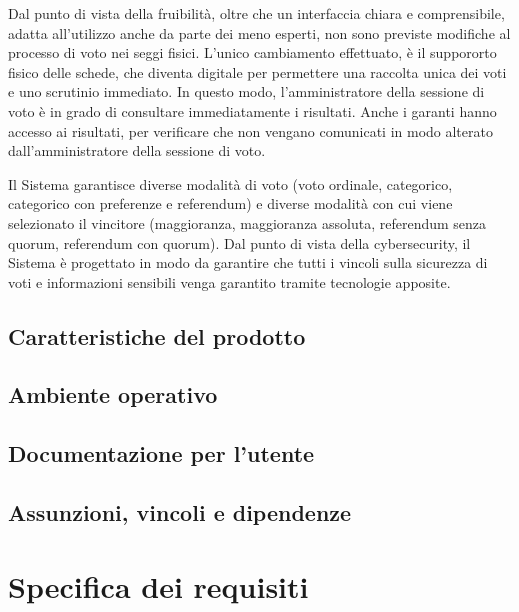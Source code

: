 \documentclass{report}
\begin{document}
Dal punto di vista della fruibilità, oltre che un interfaccia chiara e comprensibile, adatta all'utilizzo anche da parte dei meno esperti, non sono previste modifiche al processo di voto nei seggi fisici.
L'unico cambiamento effettuato, è il suppororto fisico delle schede, che diventa digitale per permettere una raccolta unica dei voti e uno scrutinio immediato.
In questo modo, l'amministratore della sessione di voto è in grado di consultare immediatamente i risultati. Anche i garanti hanno accesso ai risultati, per verificare che non vengano comunicati in modo alterato dall'amministratore della sessione di voto.
\par
Il Sistema garantisce diverse modalità di voto (voto ordinale, categorico, categorico con preferenze e referendum) e diverse modalità con cui viene selezionato il vincitore (maggioranza, maggioranza assoluta, referendum senza quorum, referendum con quorum).
Dal punto di vista della cybersecurity, il Sistema è progettato in modo da garantire che tutti i vincoli sulla sicurezza di voti e informazioni sensibili venga garantito tramite tecnologie apposite.


\section{Caratteristiche del prodotto}




\section{Ambiente operativo}




\section{Documentazione per l'utente}




\section{Assunzioni, vincoli e dipendenze}






\chapter{Specifica dei requisiti}
\end{document}
